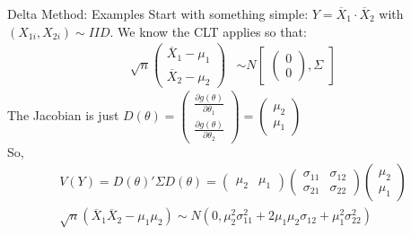   
\begin{frame}{Delta Method: Examples}
  Start with something simple: $Y= \overline{X}_1\cdot \overline{X}_2$ with $(X_{1i},X_{2i}) \sim IID$.
  We know the CLT applies so that:
  \begin{eqnarray*}
  \sqrt{n}
  \begin{pmatrix}
  \overline{X}_1 - \mu_1\\
  \overline{X}_2 - \mu_2
  \end{pmatrix} &\sim  N
  \begin{bmatrix}
  \begin{pmatrix}
  0\\
  0
  \end{pmatrix},
  \Sigma
  \end{bmatrix}
  \end{eqnarray*}
  The Jacobian is just $D(\theta) =  \begin{pmatrix}\frac{\partial g(\theta)}{\partial \theta_1} \\ \frac{\partial g(\theta)}{\partial \theta_2}  \end{pmatrix} =  \begin{pmatrix}\mu_2\\ \mu_1 \end{pmatrix}$\\
  So,
  \begin{eqnarray*}
  V(Y) = D(\theta)' \Sigma D(\theta) =\begin{pmatrix} \mu_2 & \mu_1 \end{pmatrix}  \begin{pmatrix} \sigma_{11} & \sigma_{12} \\ \sigma_{21} & \sigma_{22} \end{pmatrix} \begin{pmatrix} \mu_2 \\\mu_1  
  \end{pmatrix} \\
  \sqrt{n} ( \overline{X}_1 \overline{X}_2 - \mu_1 \mu_2) \sim N(0,\mu_2^2 \sigma_{11}^2 + 2 \mu_1 \mu_2 \sigma_{12}  + \mu_1^2 \sigma_{22}^2)
  \end{eqnarray*}
\end{frame}
  
